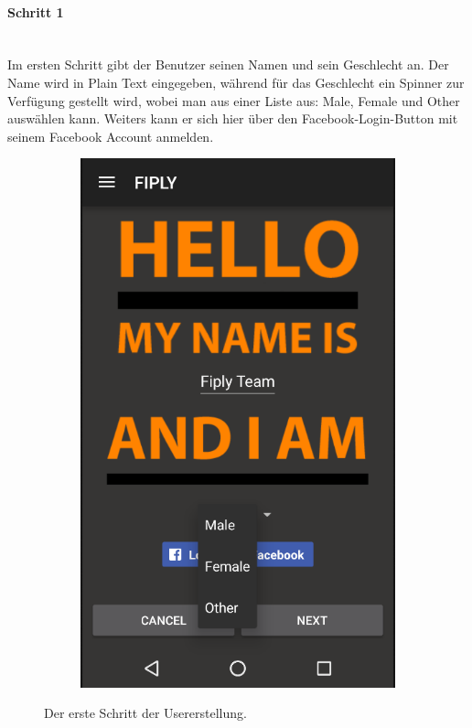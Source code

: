 \documentclass[FIPLY_base.tex]{subfiles}
\begin{document}
\paragraph{Schritt 1}\ \\
Im ersten Schritt gibt der Benutzer seinen Namen und sein Geschlecht an.
Der Name wird in Plain Text eingegeben, während für das Geschlecht ein Spinner zur Verfügung gestellt wird, wobei man aus einer Liste aus: Male, Female und Other auswählen kann.
Weiters kann er sich hier über den Facebook-Login-Button mit seinem Facebook Account anmelden.
\begin{figure}[H]
	\begin{subfigure}[b]{0.3\textwidth}
	\includegraphics[scale=0.55]{img/User_step1}
	\end{subfigure}
	\hfil
	\caption{Der erste Schritt der Usererstellung.}
\end{figure}
\newpage
\end{document}
